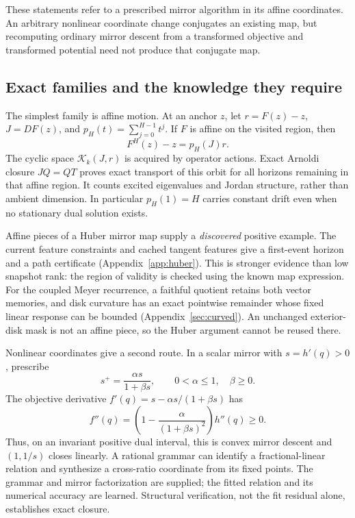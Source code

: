\documentclass[journal]{IEEEtran}
\theoremstyle{definition}
\newcommand{\K}{\mathcal{K}}
\begin{document}
These statements refer to a prescribed mirror algorithm in its affine
coordinates. An arbitrary nonlinear coordinate change conjugates an existing
map, but recomputing ordinary mirror descent from a transformed objective
and transformed potential need not produce that conjugate map.


\subsection{Exact families and the knowledge they require}
The simplest family is affine motion. At an anchor $z$, let
$r=F(z)-z$, $J=DF(z)$, and $p_H(t)=\sum_{j=0}^{H-1}t^j$. If $F$ is affine
on the visited region, then
\begin{equation}
 F^H(z)-z=p_H(J)r. \label{eq:affine}
\end{equation}
The cyclic space $\K_k(J,r)$ is acquired by operator actions. Exact Arnoldi
closure $JQ=QT$ proves exact transport of this orbit for all horizons
remaining in that affine region. It counts excited eigenvalues and Jordan
structure, rather than ambient dimension. In particular $p_H(1)=H$ carries
constant drift even when no stationary dual solution exists.

Affine pieces of a Huber mirror map supply a \emph{discovered} positive
example. The current feature constraints and cached tangent features give
a first-event horizon and a path certificate (Appendix~\ref{app:huber}).
This is stronger evidence than low snapshot rank: the region of validity
is checked using the known map expression. For the coupled Meyer recurrence,
a faithful quotient retains both vector memories, and disk curvature has
an exact pointwise remainder whose fixed linear response can be bounded
(Appendix~\ref{sec:curved}). An unchanged exterior-disk mask is not an affine
piece, so the Huber argument cannot be reused there.

Nonlinear coordinates give a second route. In a scalar mirror with
$s=h'(q)>0$, prescribe
\[
 s^+=\frac{\alpha s}{1+\beta s},\qquad 0<\alpha\leq1,\quad\beta\geq0.
\]
The objective derivative $f'(q)=s-\alpha s/(1+\beta s)$ has
\[
 f''(q)=\left(1-\frac{\alpha}{(1+\beta s)^2}\right)h''(q)\geq0.
\]
Thus, on an invariant positive dual interval, this is convex mirror descent
and $(1,1/s)$ closes linearly. A rational grammar can identify a
fractional-linear relation and synthesize a cross-ratio coordinate from
its fixed points. The grammar and mirror factorization are supplied;
the fitted relation and its numerical accuracy are learned. Structural
verification, not the fit residual alone, establishes exact closure.
\end{document}
